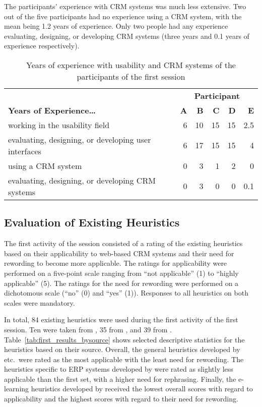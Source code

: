 The participants' experience with CRM systems was much less extensive. Two out of the five participants had no experience using a CRM system, with the mean being 1.2 years of experience. Only two people had any experience evaluating, designing, or developing CRM systems (three years and 0.1 years of experience respectively).

\begin{table}[hbtp]
	\centering
	\vspace{0.5cm}
	\caption{Years of experience with usability and CRM systems of the participants of the first session}
	\begin{tabular}{lrrrrr} \toprule
		& \multicolumn{5}{c}{\textbf{Participant}} \\
		\textbf{Years of Experience\ldots{}} & \textbf{A} & \textbf{B} & \textbf{C} & \textbf{D} & \textbf{E} \\ \midrule
		working in the usability field 							& 6 & 10 & 15 & 15 & 2.5 \\
		evaluating, designing, or developing user interfaces	& 6 & 17 & 15 & 15 & 4 \\
		using a CRM system										& 0 &  3 &  1 &  2 & 0 \\
		evaluating, designing, or developing CRM systems		& 0 &  3 &  0 &  0 & 0.1 \\
		\bottomrule
	\end{tabular}
	\label{tab:first_participants}
\end{table}

\subsection{Evaluation of Existing Heuristics}
\label{sec:evaluation_existing_first}
The first activity of the session consisted of a rating of the existing heuristics based on their applicability to web-based CRM systems and their need for rewording to become more applicable. The ratings for applicability were performed on a five-point scale ranging from ``not applicable'' (1) to ``highly applicable'' (5). The ratings for the need for rewording were performed on a dichotomous scale (``no'' (0) and ``yes'' (1)). Responses to all heuristics on both scales were mandatory.

In total, 84 existing heuristics were used during the first activity of the first session. Ten were taken from \citet{Nielsen1994a}, 35 from \citet{Singh2009}, and 39 from \citet{Ardito2006}. Table~\ref{tab:first_results_bysource} shows selected descriptive statistics for the heuristics based on their source. Overall, the general heuristics developed by \citet{Nielsen1994a} etc.\ were rated as the most applicable with the least need for rewording. The heuristics specific to ERP systems developed by \citet{Singh2009} were rated as slightly less applicable than the first set, with a higher need for rephrasing. Finally, the e-learning heuristics developed by \citet{Ardito2006} received the lowest overall scores with regard to applicability and the highest scores with regard to their need for rewording.

